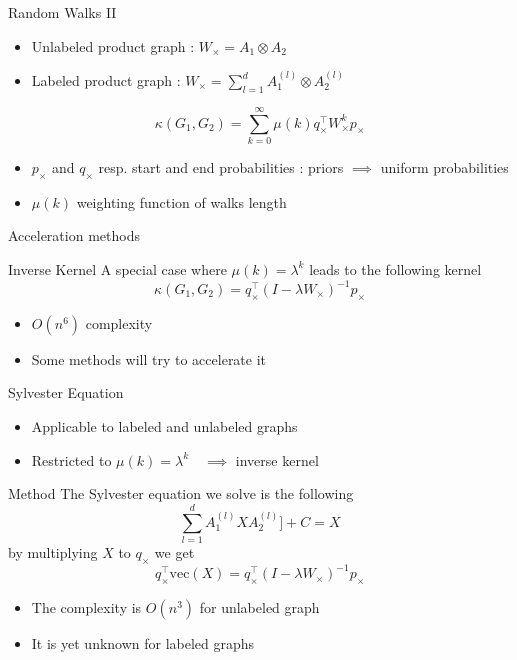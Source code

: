 \documentclass[compress]{beamer}
\begin{document}
\begin{frame}{Random Walks II}
	\begin{itemize}
		\item Unlabeled product graph : $W_{\times}=A_1\otimes A_2$
		\item Labeled product graph : $W_{\times}=\sum\limits_{l=1}^{d} A_1^{(l)} \otimes A_2^{(l)}$
	\end{itemize}
	\begin{equation*}
	\kappa(G_1,G_2) = \sum\limits_{k=0}^{\infty}\mu(k)q_{\times}^{\top}W_{\times}^{k}p_{\times}
	\end{equation*}
	\begin{itemize}
		\item $p_\times$ and $q_\times$ resp. start and end probabilities : priors $\implies$ uniform probabilities
		\item $\mu(k)$ weighting function of walks length
	\end{itemize}
\end{frame}
\begin{frame}{Acceleration methods}
\begin{block}{Inverse Kernel}
A special case where $\mu(k)=\lambda^k$ leads to the following kernel
	\begin{equation*}
	\kappa(G_1,G_2)=q_{\times}^{\top}(I-\lambda W_\times)^{-1}p_{\times}
	\end{equation*}
\end{block}
\begin{itemize}
	\item $O(n^6)$ complexity
	\item Some methods will try to accelerate it
\end{itemize}
\end{frame}
\begin{frame}{Sylvester Equation}
\begin{itemize}
	\item Applicable to labeled and unlabeled graphs
	\item Restricted to $\mu(k)=\lambda^k\quad\implies$ inverse kernel
\end{itemize}
\begin{block}{Method}
	The Sylvester equation we solve is the following
	\begin{equation*}
	\sum\limits_{l=1}^{d}A_{1}^{(l)}XA_{2}^{(l)}]+C=X
	\end{equation*}
	by multiplying $X$ to $q_\times$ we get 
	\begin{equation*}
		q_{\times}^{\top}\text{vec}(X)=q_{\times}^{\top}(I-\lambda W_{\times})^{-1}p_{\times}
	\end{equation*}
\end{block}
\begin{itemize}
	\item The complexity is $O(n^3)$ for unlabeled graph
	\item It is yet unknown for labeled graphs \citep{vishwanathan_graph_2010}
\end{itemize}
\end{frame}
\end{document}
